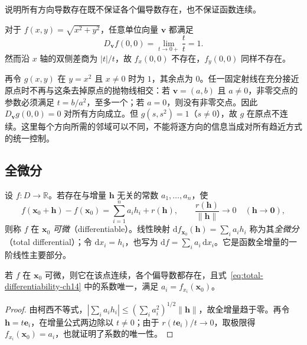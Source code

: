\documentclass[UTF8,12pt,a4paper,fontset=fandol]{ctexbook}
\begin{document}
\begin{example}
\label{ex:directional-derivatives-without-continuity-ch14}
说明所有方向导数存在既不保证各个偏导数存在，也不保证函数连续。
\end{example}
\begin{solve}
对于 $f(x,y)=\sqrt{x^2+y^2}$，任意单位向量 $\boldsymbol v$ 都满足
\[
    D_{\boldsymbol v}f(0,0)=\lim_{t\to0+}\frac{t}{t}=1.
\]
然而沿 $x$ 轴的双侧差商为 $|t|/t$，故 $f_x(0,0)$ 不存在，$f_y(0,0)$ 同样不存在。

再令 $g(x,y)$ 在 $y=x^2$ 且 $x\ne0$ 时为 $1$，其余点为 $0$。任一固定射线在充分接近原点时不再与这条去掉原点的抛物线相交：若 $\boldsymbol v=(a,b)$ 且 $a\ne0$，非零交点的参数必须满足 $t=b/a^2$，至多一个；若 $a=0$，则没有非零交点。因此 $D_{\boldsymbol v}g(0,0)=0$ 对所有方向成立。但 $g(s,s^2)=1$（$s\ne0$），故 $g$ 在原点不连续。这里每个方向所需的邻域可以不同，不能将逐方向的信息当成对所有趋近方式的统一控制。
\end{solve}

\subsection{全微分}
\label{subsec:total-differentials}

\begin{definition}
\label{def:total-differentiability-ch14}
设 $f:D\to\mathbb R$。若存在与增量 $\boldsymbol h$ 无关的常数 $a_1,\ldots,a_n$，使
\begin{equation}
\label{eq:total-differentiability-ch14}
    f(\boldsymbol x_0+\boldsymbol h)-f(\boldsymbol x_0)
    =\sum_{i=1}^n a_i h_i+r(\boldsymbol h),
    \qquad \frac{r(\boldsymbol h)}{\|\boldsymbol h\|}\longrightarrow0
    \quad(\boldsymbol h\to\boldsymbol0),
\end{equation}
则称 $f$ 在 $\boldsymbol x_0$ \emph{可微}（differentiable）。线性映射
$\mathrm df_{\boldsymbol x_0}(\boldsymbol h)=\sum_i a_i h_i$ 称为其\emph{全微分}（total differential）；令 $\mathrm dx_i=h_i$，也写为 $\mathrm df=\sum_i a_i\,\mathrm dx_i$。它是函数全增量的一阶线性主要部分。
\end{definition}

\begin{theorem}
\label{thm:differentiability-implies-partials-ch14}
若 $f$ 在 $\boldsymbol x_0$ 可微，则它在该点连续，各个偏导数都存在，且式~\eqref{eq:total-differentiability-ch14} 中的系数唯一，满足 $a_i=f_{x_i}(\boldsymbol x_0)$。
\end{theorem}
\begin{proof}
由柯西不等式，$|\sum_i a_i h_i|\leq(\sum_i a_i^2)^{1/2}\|\boldsymbol h\|$，故全增量趋于零。再令 $\boldsymbol h=t\boldsymbol e_i$，在增量公式两边除以 $t\ne0$；由于 $r(t\boldsymbol e_i)/t\to0$，取极限得 $f_{x_i}(\boldsymbol x_0)=a_i$，也就证明了系数的唯一性。
\end{proof}
\end{document}
